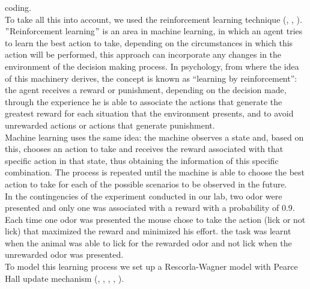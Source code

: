 coding.\\To take all this into account, we used the reinforcement learning technique (\cite{RescorlaWagner}, \cite{Sutton}, \cite{SuttonBarto}).\\$"$Reinforcement learning$"$ is an area in machine learning, in which an agent tries to learn the best action to take, depending on the circumstances in which this action will be performed, this approach can incorporate any changes in the environment of the decision making process. In psychology, from where the idea of this machinery derives, the concept is known as “learning by reinforcement”: the agent receives a reward or punishment, depending on the decision made, through the experience he is able to associate the actions that generate the greatest reward for each situation that the environment presents, and to avoid unrewarded actions or actions that generate punishment.\\
Machine learning uses the same idea: the machine observes a state and, based on this, chooses an action to take and receives the reward associated with that specific action in that state, thus obtaining the information of this specific combination. The process is repeated until the machine is able to choose the best action to take for each of the possible scenarios to be observed in the future.\\In the contingencies of the experiment conducted in our lab, two odor were presented and only one was associated with a reward with a probability of 0.9. Each time one odor was presented the mouse chose to take the action (lick or not lick) that maximized the reward and minimized his effort. the task was learnt when the animal was able to lick for the rewarded odor and not lick when the unrewarded odor was presented.\\To model this learning process we set up a Rescorla-Wagner model with Pearce Hall update mechanism (\cite{RescorlaWagner}, \cite{PearceHall}, \cite{Li}, \cite{Costa}, \cite{Koppe}).\\

